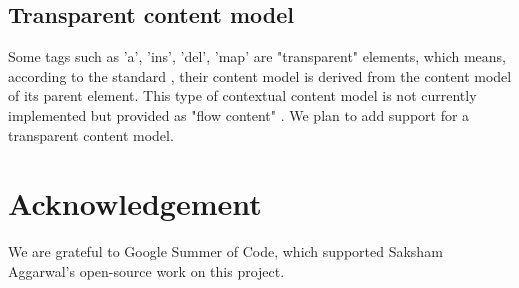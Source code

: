 \documentclass[conference]{IEEEtran}
\begin{document}
\subsection{Transparent content model}
Some tags such as 'a', 'ins', 'del', 'map' are "transparent" elements, which means, according to the standard \cite{whatwgtransparent}, their content model is derived from the content model of its parent element. This type of contextual content model is not currently implemented but provided as "flow content" \cite{flowcontent}.  We plan to add support for a transparent content model.

\section*{Acknowledgement}

We are grateful to Google Summer of Code, which supported Saksham Aggarwal's open-source work on this project.
\end{document}
